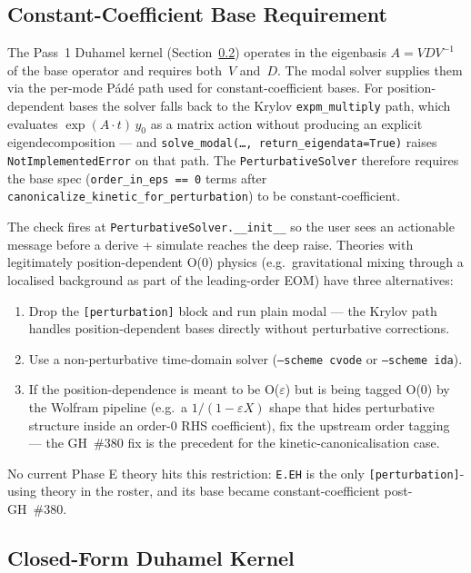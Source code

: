 \subsection{Constant-Coefficient Base Requirement}
\label{sec:pr-constant-coeff-base}

The Pass~1 Duhamel kernel (Section~\ref{sec:pr-duhamel}) operates in the eigenbasis $A = V D V^{-1}$ of the base operator and requires both~$V$ and~$D$. The modal solver supplies them via the per-mode P\'ad\'e path used for constant-coefficient bases. For position-dependent bases the solver falls back to the Krylov \texttt{expm\_multiply} path, which evaluates $\exp(A \cdot t)\,y_0$ as a matrix action without producing an explicit eigendecomposition --- and \texttt{solve\_modal(\ldots,\ return\_eigendata=True)} raises \texttt{NotImplementedError} on that path. The \texttt{PerturbativeSolver} therefore requires the base spec (\verb|order_in_eps == 0| terms after \verb|canonicalize_kinetic_for_perturbation|) to be constant-coefficient.

The check fires at \texttt{PerturbativeSolver.\_\_init\_\_} so the user sees an actionable message before a derive + simulate reaches the deep raise. Theories with legitimately position-dependent O(0) physics (e.g.\ gravitational mixing through a localised background as part of the leading-order EOM) have three alternatives:
\begin{enumerate}
  \item Drop the \texttt{[perturbation]} block and run plain modal --- the Krylov path handles position-dependent bases directly without perturbative corrections.
  \item Use a non-perturbative time-domain solver (\texttt{--scheme cvode} or \texttt{--scheme ida}).
  \item If the position-dependence is meant to be O($\varepsilon$) but is being tagged O($0$) by the Wolfram pipeline (e.g.\ a $1/(1-\varepsilon X)$ shape that hides perturbative structure inside an order-0 RHS coefficient), fix the upstream order tagging --- the GH~\#380 fix is the precedent for the kinetic-canonicalisation case.
\end{enumerate}

No current Phase E theory hits this restriction: \texttt{E.EH} is the only \texttt{[perturbation]}-using theory in the roster, and its base became constant-coefficient post-GH~\#380.

\subsection{Closed-Form Duhamel Kernel}
\label{sec:pr-duhamel}

